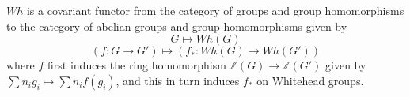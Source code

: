 $Wh$ is a covariant functor from the category of groups and group homomorphisms to the category of abelian groups and group homomorphisms given by
$$G \mapsto Wh(G)$$
$$(f: G \rightarrow G') \mapsto (f_*: Wh(G) \rightarrow Wh(G'))$$
where $f$ first induces the ring homomorphism $\mathbb{Z}(G) \rightarrow \mathbb{Z}(G')$ given by $\sum n_i g_i \mapsto \sum n_i f(g_i)$, and this in turn induces $f_*$ on Whitehead groups.
